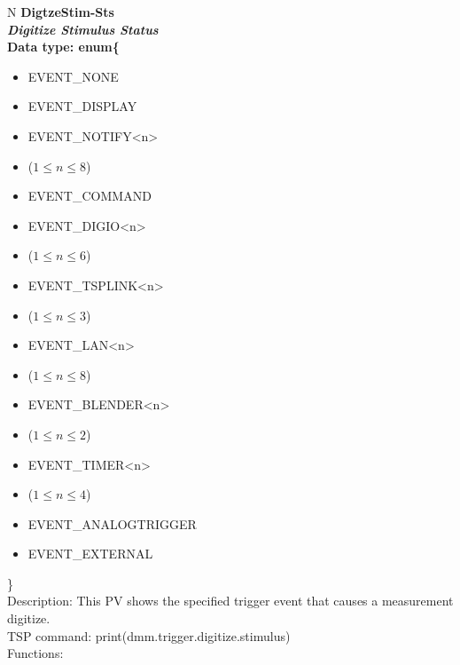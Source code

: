 \documentclass[openany]{article}
\begin{document}
		\begin{tabular}{N}
			\hline
			\bfseries DigtzeStim-Sts\label{pv:digtzestim-sts} \\ \hline
			\emph{Digitize Stimulus Status} \\
			Data type: enum\{\begin{itemize}[noitemsep]
				\small
				\item[] EVENT\_NONE
				\item[] EVENT\_DISPLAY
				\item[] EVENT\_NOTIFY\textless n\textgreater
				\item[] ($1\leq n\leq 8$)
				\item[] EVENT\_COMMAND
				\item[] EVENT\_DIGIO\textless n\textgreater
				\item[] ($1\leq n\leq 6$)
				\item[] EVENT\_TSPLINK\textless n\textgreater
				\item[] ($1\leq n\leq 3$)
				\item[] EVENT\_LAN\textless n\textgreater
				\item[] ($1\leq n\leq 8$)
				\item[] EVENT\_BLENDER\textless n\textgreater 
				\item[] ($1\leq n\leq 2$)
				\item[] EVENT\_TIMER\textless n\textgreater
				\item[] ($1\leq n\leq 4$)
				\item[] EVENT\_ANALOGTRIGGER
				\item[] EVENT\_EXTERNAL
			\end{itemize}\} \\
			Description: This PV shows the specified trigger event that causes a measurement digitize. \\
			TSP command: print(dmm.trigger.digitize.stimulus) \\
			Functions: \\
			\arrayrulecolor{\FuncTableBorderColor}

		\end{tabular}
\end{document}
